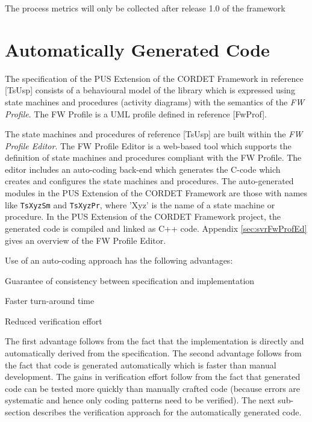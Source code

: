 \documentclass{pnp_article}
\begin{document}
The process metrics will only be collected after release 1.0 of the framework

\section{Automatically Generated Code}\label{sec:svrAutoCode}
The specification of the PUS Extension of the CORDET Framework in reference [TsUsp] consists of a behavioural model of the library which is expressed using state machines and procedures (activity diagrams) with the semantics of the \textit{FW Profile}. The FW Profile is a UML profile defined in reference [FwProf]. 

The state machines and procedures of reference [TsUsp] are built within the \textit{FW Profile Editor}. The FW Profile Editor is a web-based tool which supports the definition of state machines and procedures compliant with the FW Profile. The editor includes an auto-coding back-end which generates the C-code which creates and configures the state machines and procedures. The auto-generated modules in the PUS Extension of the CORDET Framework are those with names like \texttt{TsXyzSm} and \texttt{TsXyzPr}, where 'Xyz' is the name of a state machine or procedure. In the PUS Extension of the CORDET Framework project, the generated code is compiled and linked as C++ code. Appendix \ref{sec:svrFwProfEd} gives an overview of the FW Profile Editor.

Use of an auto-coding approach has the following advantages:

\begin{fw_itemize}
\item Guarantee of consistency between specification and implementation 
\item Faster turn-around time 
\item Reduced verification effort 
\end{fw_itemize}

The first advantage follows from the fact that the implementation is directly and automatically derived from the specification. The second advantage follows from the fact that code is generated automatically which is faster than manual development. The gains in verification effort follow from the fact that generated code can be tested more quickly than manually crafted code (because errors are systematic and hence only coding patterns need to be verified). The next sub-section describes the verification approach for the automatically generated code.
\end{document}
